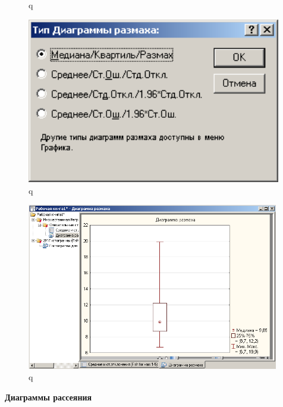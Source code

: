 \begin{figure}[!h]
\begin{minipage}{0.32\textwidth}
    \caption{q}
    \label{fig:var5__12}
  \end{minipage}
  \begin{minipage}{0.32\textwidth}
    \centering

    \includegraphics[width=0.99\textwidth]
    {inc/var5__13.PNG}

    \caption{q}
    \label{fig:var5__13}
  \end{minipage}
\end{figure}

\begin{figure}[!h]
  \centering

  \includegraphics[width=11cm]
  {inc/var5__14.PNG}

  \caption{q}

  \label{fig:var5__14}
\end{figure}

\newpage

\begin{center}
  \textbf{Диаграммы рассеяния}
\end{center}

